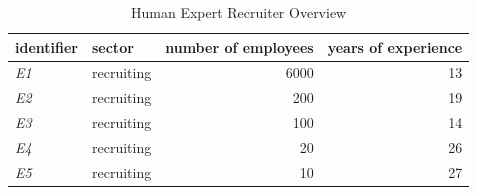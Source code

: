 \documentclass[draft,final]{thesisclass} %
\begin{document}
\begin{table}[H]
    \centering{}
    \begin{tabular}{|l|l|r|r|}
    \hline
    \textbf{identifier} & \textbf{sector} & \multicolumn{1}{l|}{\textbf{number of employees}} & \multicolumn{1}{l|}{\textbf{years of experience}} \\ \hline
    \textit{E1}          & recruiting      & 6000          & 13                  \\ \hline
    \textit{E2}          & recruiting      & 200           & 19                  \\ \hline
    \textit{E3}          & recruiting      & 100           & 14                  \\ \hline
    \textit{E4}          & recruiting      & 20            & 26                  \\ \hline
    \textit{E5}          & recruiting      & 10            & 27                  \\ \hline
    \end{tabular}
    \caption{Human Expert Recruiter Overview}
    \label{human_expert_recruiter_overview}
\end{table}
\end{document}
